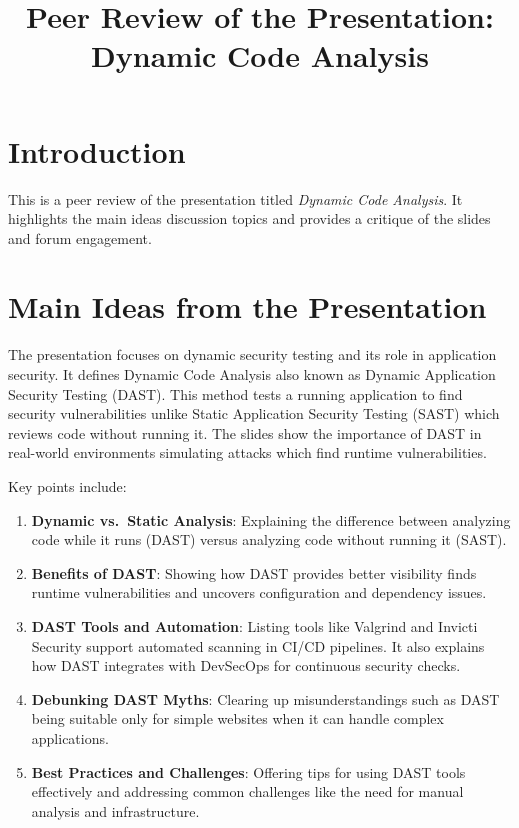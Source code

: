 \documentclass{article}
\begin{document}
\title{Peer Review of the Presentation: Dynamic Code Analysis}
\date{}
\maketitle

\section*{Introduction}

This is a peer review of the presentation titled \textit{Dynamic Code Analysis}. It highlights the main ideas discussion topics and provides a critique of the slides and forum engagement.

\section*{Main Ideas from the Presentation}

The presentation focuses on dynamic security testing and its role in application security. It defines Dynamic Code Analysis also known as Dynamic Application Security Testing (DAST). This method tests a running application to find security vulnerabilities unlike Static Application Security Testing (SAST) which reviews code without running it. The slides show the importance of DAST in real-world environments simulating attacks which find runtime vulnerabilities.

Key points include:

\begin{enumerate}
    \item \textbf{Dynamic vs.\ Static Analysis}: Explaining the difference between analyzing code while it runs (DAST) versus analyzing code without running it (SAST).
    \item \textbf{Benefits of DAST}: Showing how DAST provides better visibility finds runtime vulnerabilities and uncovers configuration and dependency issues.
    \item \textbf{DAST Tools and Automation}: Listing tools like Valgrind and Invicti Security support automated scanning in CI/CD pipelines. It also explains how DAST integrates with DevSecOps for continuous security checks.
    \item \textbf{Debunking DAST Myths}: Clearing up misunderstandings such as DAST being suitable only for simple websites when it can handle complex applications.
    \item \textbf{Best Practices and Challenges}: Offering tips for using DAST tools effectively and addressing common challenges like the need for manual analysis and infrastructure.
\end{enumerate}
\end{document}
